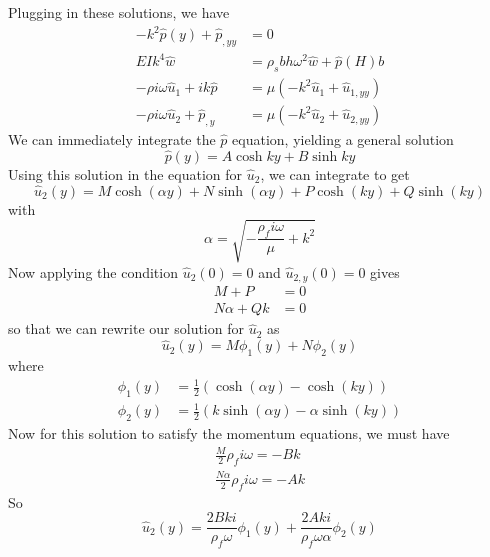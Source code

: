 \documentclass{article}
\begin{document}
Plugging in these solutions, we have
\begin{equation} \begin{aligned} 
-k^2\hat{p}(y) + \hat{p}_{,yy} &= 0 \\
EIk^4\hat{w}&=\rho_s b h\omega^2\hat{w}+\hat{p}(H)b \\
-\rho i \omega \hat{u}_1+ik\hat{p}&=\mu(-k^2\hat{u}_1+\hat{u}_{1,yy}) \\
-\rho i \omega \hat{u}_2+\hat{p}_{,y}&=\mu(-k^2\hat{u}_2+\hat{u}_{2,yy}) 
\end{aligned} \label{eq:eq500}
\end{equation}
We can immediately integrate the $\hat{p}$ equation, yielding a general solution
\begin{equation} \hat{p}(y) = A\cosh{ky}+B\sinh{ky}  \label{eq:eq550} \end{equation}
Using this solution in the equation for $\hat{u}_2$, we can integrate to get
\begin{equation} \hat{u}_2(y) = M\cosh(\alpha y)+N\sinh(\alpha y)+P\cosh(k y)+Q\sinh(k y) \label{eq:eq600} \end{equation}
with 
\begin{equation} \alpha = \sqrt{-\frac{\rho_f i \omega}{\mu}+k^2}\label{eq:eq700} \end{equation}
Now applying the condition $\hat{u}_2(0)=0$ and $\hat{u}_{2,y}(0) = 0$ gives
\begin{align*}
M+P&=0\\
N\alpha+Qk&=0
\end{align*}
so that we can rewrite our solution for $\hat{u}_2$ as 
\[\hat{u}_2(y) = M\phi_1(y)+N\phi_2(y) \]
where 
\begin{equation}
\begin{aligned}
\phi_1(y) &= \frac{1}{2}\left(\cosh(\alpha y)-\cosh(k y)\right) \\
\phi_2(y) &= \frac{1}{2}\left(k\sinh(\alpha y)-\alpha\sinh(k y)\right)
\end{aligned} \label{eq:eq800}
\end{equation}
Now for this solution to satisfy the momentum equations, we must have
\begin{align*}
\frac{M}{2}\rho_f i \omega = -Bk \\
\frac{N\alpha}{2}\rho _fi \omega = -Ak
\end{align*}
So 
\begin{equation} \hat{u}_2(y) = \frac{2Bki}{\rho_f \omega}\phi_1(y)+\frac{2Aki}{\rho_f \omega \alpha}\phi_2(y)  \label{eq:eq900} \end{equation}
\end{document}
